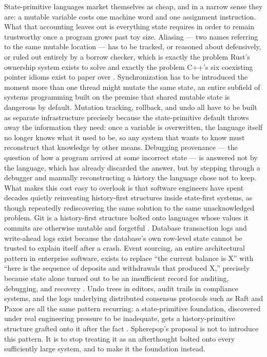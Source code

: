 \documentclass[11pt]{article}
\begin{document}
State-primitive languages market themselves as cheap, and in a narrow sense they are: a mutable variable costs one machine word and one assignment instruction. What that accounting leaves out is everything state requires in order to remain trustworthy once a program grows past toy size. Aliasing --- two names referring to the same mutable location --- has to be tracked, or reasoned about defensively, or ruled out entirely by a borrow checker, which is exactly the problem Rust's ownership system exists to solve and exactly the problem C++'s six coexisting pointer idioms exist to paper over \cite{jung2018}. Synchronization has to be introduced the moment more than one thread might mutate the same state, an entire subfield of systems programming built on the premise that shared mutable state is dangerous by default. Mutation tracking, rollback, and undo all have to be built as separate infrastructure precisely because the state-primitive default throws away the information they need: once a variable is overwritten, the language itself no longer knows what it used to be, so any system that wants to know must reconstruct that knowledge by other means. Debugging provenance --- the question of how a program arrived at some incorrect state --- is answered not by the language, which has already discarded the answer, but by stepping through a debugger and manually reconstructing a history the language chose not to keep. What makes this cost easy to overlook is that software engineers have spent decades quietly reinventing history-first structures inside state-first systems, as though repeatedly rediscovering the same solution to the same unacknowledged problem. Git is a history-first structure bolted onto languages whose values it commits are otherwise mutable and forgetful \cite{chacon2014}. Database transaction logs and write-ahead logs exist because the database's own row-level state cannot be trusted to explain itself after a crash. Event sourcing, an entire architectural pattern in enterprise software, exists to replace ``the current balance is X'' with ``here is the sequence of deposits and withdrawals that produced X,'' precisely because state alone turned out to be an insufficient record for auditing, debugging, and recovery \cite{fowler2005}. Undo trees in editors, audit trails in compliance systems, and the logs underlying distributed consensus protocols such as Raft and Paxos are all the same pattern recurring: a state-primitive foundation, discovered under real engineering pressure to be inadequate, gets a history-primitive structure grafted onto it after the fact \cite{lamport1998,ongaro2014}. Spherepop's proposal is not to introduce this pattern. It is to stop treating it as an afterthought bolted onto every sufficiently large system, and to make it the foundation instead.
\end{document}
